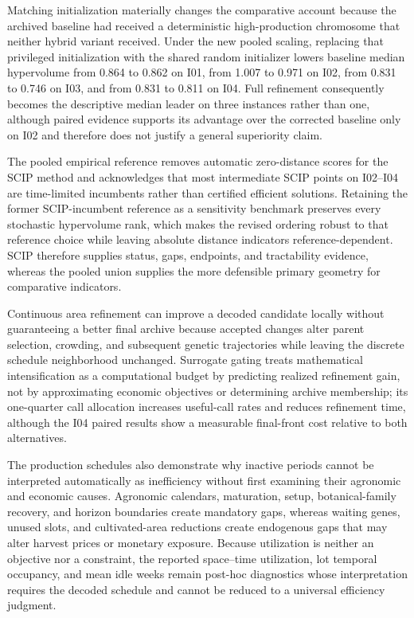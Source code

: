 \documentclass[]{interact}
\begin{document}
Matching initialization materially changes the comparative account because the archived baseline had received a deterministic high-production chromosome that neither hybrid variant received. Under the new pooled scaling, replacing that privileged initialization with the shared random initializer lowers baseline median hypervolume from 0.864 to 0.862 on I01, from 1.007 to 0.971 on I02, from 0.831 to 0.746 on I03, and from 0.831 to 0.811 on I04. Full refinement consequently becomes the descriptive median leader on three instances rather than one, although paired evidence supports its advantage over the corrected baseline only on I02 and therefore does not justify a general superiority claim.

The pooled empirical reference removes automatic zero-distance scores for the SCIP method and acknowledges that most intermediate SCIP points on I02--I04 are time-limited incumbents rather than certified efficient solutions. Retaining the former SCIP-incumbent reference as a sensitivity benchmark preserves every stochastic hypervolume rank, which makes the revised ordering robust to that reference choice while leaving absolute distance indicators reference-dependent. SCIP therefore supplies status, gaps, endpoints, and tractability evidence, whereas the pooled union supplies the more defensible primary geometry for comparative indicators.

Continuous area refinement can improve a decoded candidate locally without guaranteeing a better final archive because accepted changes alter parent selection, crowding, and subsequent genetic trajectories while leaving the discrete schedule neighborhood unchanged. Surrogate gating treats mathematical intensification as a computational budget by predicting realized refinement gain, not by approximating economic objectives or determining archive membership; its one-quarter call allocation increases useful-call rates and reduces refinement time, although the I04 paired results show a measurable final-front cost relative to both alternatives.

The production schedules also demonstrate why inactive periods cannot be interpreted automatically as inefficiency without first examining their agronomic and economic causes. Agronomic calendars, maturation, setup, botanical-family recovery, and horizon boundaries create mandatory gaps, whereas waiting genes, unused slots, and cultivated-area reductions create endogenous gaps that may alter harvest prices or monetary exposure. Because utilization is neither an objective nor a constraint, the reported space--time utilization, lot temporal occupancy, and mean idle weeks remain post-hoc diagnostics whose interpretation requires the decoded schedule and cannot be reduced to a universal efficiency judgment.
\end{document}

